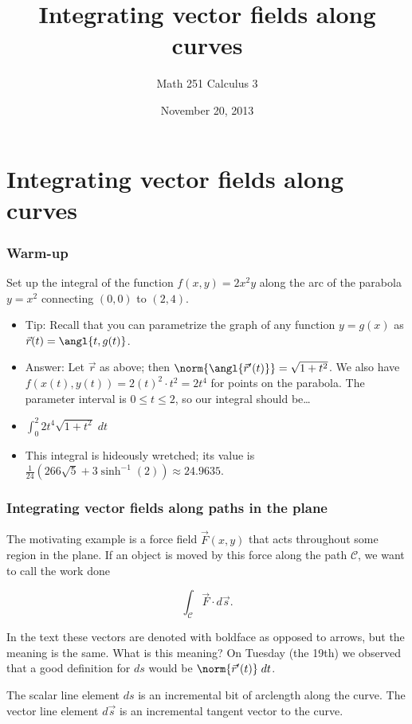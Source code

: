 \documentclass[11pt,ignorenonframetext,aspectratio=169,xcolor={svgnames}]{beamer}
\title{Integrating vector fields along curves}
\author{Math 251 Calculus 3}
\date{November 20, 2013}
\begin{document}
\frame{\titlepage}

\section{Integrating vector fields along curves}

\begin{frame}\frametitle{Warm-up}

Set up the integral of the function $f(x,y) = 2x^2 y$ along the arc of
the parabola $y = x^2$ connecting $(0,0)$ to $(2,4)$.

\begin{itemize}[<+->]
\itemsep1pt\parskip0pt
\item
  Tip: Recall that you can parametrize the graph of any function
  $y = g(x)$ as $\vec{r}(t) = \angl{t, g(t)}$.
\item
  Answer: Let $\vec{r}$ as above; then
  $\norm{\angl{\vec{r}'(t)}} = \sqrt{1+t^2}$. We also have
  $f(x(t),y(t)) = 2(t)^2 \cdot t^2 = 2t^4$ for points on the parabola.
  The parameter interval is $0 \leq t \leq 2$, so our integral should
  be\ldots{}
\item
  $\int_0^2 2t^4 \sqrt{1+t^2} \; dt$
\item
  This integral is hideously wretched; its value is
  $\frac{1}{24} \left( 266 \sqrt{5} + 3 \sinh^{-1}(2) \right) \approx 24.9635$.
\end{itemize}

\end{frame}

\begin{frame}\frametitle{Integrating vector fields along paths in the
plane}

The motivating example is a force field $\vec{F}(x,y)$ that acts
throughout some region in the plane. If an object is moved by this force
along the path $\mathcal{C}$, we want to call the work done

\begin{equation*}
    \int_{\mathcal{C}} \vec{F} \cdot d\vec{s}.
\end{equation*}

In the text these vectors are denoted with boldface as opposed to
arrows, but the meaning is the same. What is this meaning? On Tuesday
(the 19th) we observed that a good definition for $ds$ would be
$\norm{\vec{r}'(t)} \; dt$.

The scalar line element $ds$ is an incremental bit of arclength along
the curve. The vector line element $d\vec{s}$ is an incremental tangent
vector to the curve.

\end{frame}
\end{document}

